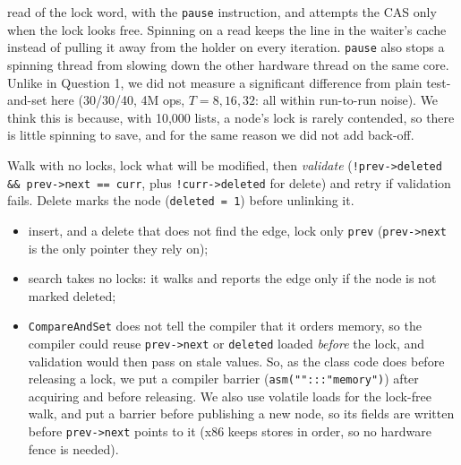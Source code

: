 \documentclass[10pt,a4paper]{article}
\begin{document}
\begin{description}
  read of the lock word, with the \texttt{pause} instruction, and attempts the CAS only when the lock looks free. Spinning on a read keeps the line in the
  waiter's cache instead of pulling it away from the holder on every iteration. \texttt{pause} also stops a spinning thread from slowing down the other
  hardware thread on the same core. Unlike in Question 1, we did not measure a significant difference from plain test-and-set here (30/30/40, 4M ops, $T=8,16,32$:
  all within run-to-run noise). We think this is because, with 10{,}000 lists, a node's lock is rarely contended, so there is little spinning to save,
  and for the same reason we did not add back-off.
\item[P6, optimistic locking.] Walk with no locks, lock what will be modified, then \emph{validate}
  (\texttt{!prev->deleted \&\& prev->next == curr}, plus \texttt{!curr->deleted} for delete) and retry if validation fails. Delete marks the node
  (\texttt{deleted = 1}) before unlinking it.
  \begin{itemize}
  \item insert, and a delete that does not find the edge, lock only \texttt{prev} (\texttt{prev->next} is the only pointer they rely on);
  \item search takes no locks: it walks and reports the edge only if the node is not marked deleted;
  \item \texttt{CompareAndSet} does not tell the compiler that it orders memory, so the compiler could reuse
        \texttt{prev->next} or \texttt{deleted} loaded \emph{before} the lock, and validation would then pass on stale values. So, as the class code does
        before releasing a lock, we put a compiler barrier (\texttt{asm("":::"memory")}) after acquiring and before releasing.
        We also use volatile loads for the lock-free walk, and put a barrier before publishing a new node, so its fields are written before \texttt{prev->next} points to it
        (x86 keeps stores in order, so no hardware fence is needed).
  \end{itemize}
\end{description}
\end{document}
